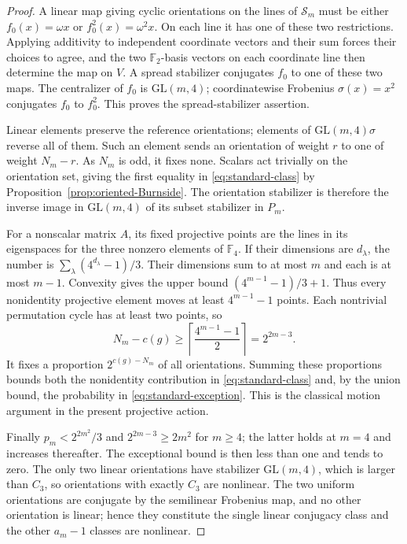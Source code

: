 \documentclass[11pt]{article}
\begin{document}
\begin{proof}
A linear map giving cyclic orientations on the lines of $\mathcal S_m$
must be either $f_0(x)=\omega x$ or $f_0^2(x)=\omega^2x$.
On each line it has one of these two restrictions. Applying additivity
to independent coordinate vectors and their sum forces their choices to
agree, and the two $\mathbb F_2$-basis vectors on each coordinate line
then determine the map on $V$. A spread stabilizer conjugates $f_0$ to
one of these two maps. The centralizer of $f_0$ is $\mathrm{GL}(m,4)$;
coordinatewise Frobenius $\sigma(x)=x^2$ conjugates $f_0$ to $f_0^2$.
This proves the spread-stabilizer assertion.

Linear elements preserve the reference orientations; elements of
$\mathrm{GL}(m,4)\sigma$ reverse all of them. Such an element sends an
orientation of weight $r$ to one of weight $N_m-r$. As $N_m$ is odd, it
fixes none. Scalars act trivially on the orientation set, giving
the first equality in \eqref{eq:standard-class} by
Proposition~\ref{prop:oriented-Burnside}.
The orientation stabilizer is therefore the inverse image in
$\mathrm{GL}(m,4)$ of its subset stabilizer in $P_m$.

For a nonscalar matrix $A$, its fixed projective points are the lines in
its eigenspaces for the three nonzero elements of $\mathbb F_4$.
If their dimensions are $d_\lambda$, the number is
$\sum_\lambda(4^{d_\lambda}-1)/3$.
Their dimensions sum to at most $m$ and each is at most $m-1$.
Convexity gives the upper bound $(4^{m-1}-1)/3+1$.
Thus every nonidentity projective element moves at least $4^{m-1}-1$
points. Each nontrivial permutation cycle has at least two points, so
\[
N_m-c(g)\ge
\left\lceil\frac{4^{m-1}-1}{2}\right\rceil=2^{2m-3}.
\]
It fixes a proportion $2^{c(g)-N_m}$ of all orientations.
Summing these proportions bounds both the nonidentity contribution
in \eqref{eq:standard-class} and, by the union bound, the probability
in \eqref{eq:standard-exception}. This is the classical motion argument
\cite{RS98} in the present projective action.

Finally $p_m<2^{2m^2}/3$ and $2^{2m-3}\ge2m^2$ for $m\ge4$;
the latter holds at $m=4$ and increases thereafter.
The exceptional bound is then less than one and tends to zero.
The only two linear orientations have stabilizer $\mathrm{GL}(m,4)$,
which is larger than $C_3$, so orientations with exactly $C_3$ are nonlinear.
The two uniform orientations are conjugate by the semilinear Frobenius map,
and no other orientation is linear; hence they constitute the single
linear conjugacy class and the other $a_m-1$ classes are nonlinear.
\end{proof}
\end{document}
